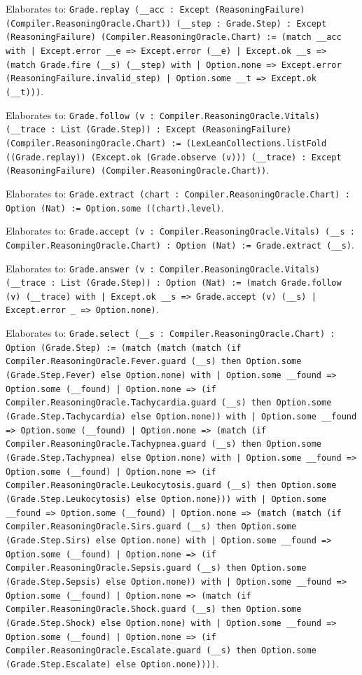 \documentclass[11pt]{article}
\begin{document}
\noindent Elaborates to: \texttt{Grade.replay (\_\_acc : Except (ReasoningFailure) (Compiler.ReasoningOracle.Chart)) (\_\_step : Grade.Step) : Except (ReasoningFailure) (Compiler.ReasoningOracle.Chart) := (match \_\_acc with | Except.error \_\_e => Except.error (\_\_e) | Except.ok \_\_s => (match Grade.fire (\_\_s) (\_\_step) with | Option.none => Except.error (ReasoningFailure.invalid\_step) | Option.some \_\_t => Except.ok (\_\_t)))}.\par
\noindent Elaborates to: \texttt{Grade.follow (v : Compiler.ReasoningOracle.Vitals) (\_\_trace : List (Grade.Step)) : Except (ReasoningFailure) (Compiler.ReasoningOracle.Chart) := (LexLeanCollections.listFold ((Grade.replay)) (Except.ok (Grade.observe (v))) (\_\_trace) : Except (ReasoningFailure) (Compiler.ReasoningOracle.Chart))}.\par
\noindent Elaborates to: \texttt{Grade.extract (chart : Compiler.ReasoningOracle.Chart) : Option (Nat) := Option.some ((chart).level)}.\par
\noindent Elaborates to: \texttt{Grade.accept (v : Compiler.ReasoningOracle.Vitals) (\_\_s : Compiler.ReasoningOracle.Chart) : Option (Nat) := Grade.extract (\_\_s)}.\par
\noindent Elaborates to: \texttt{Grade.answer (v : Compiler.ReasoningOracle.Vitals) (\_\_trace : List (Grade.Step)) : Option (Nat) := (match Grade.follow (v) (\_\_trace) with | Except.ok \_\_s => Grade.accept (v) (\_\_s) | Except.error \_ => Option.none)}.\par
\noindent Elaborates to: \texttt{Grade.select (\_\_s : Compiler.ReasoningOracle.Chart) : Option (Grade.Step) := (match (match (match (if Compiler.ReasoningOracle.Fever.guard (\_\_s) then Option.some (Grade.Step.Fever) else Option.none) with | Option.some \_\_found => Option.some (\_\_found) | Option.none => (if Compiler.ReasoningOracle.Tachycardia.guard (\_\_s) then Option.some (Grade.Step.Tachycardia) else Option.none)) with | Option.some \_\_found => Option.some (\_\_found) | Option.none => (match (if Compiler.ReasoningOracle.Tachypnea.guard (\_\_s) then Option.some (Grade.Step.Tachypnea) else Option.none) with | Option.some \_\_found => Option.some (\_\_found) | Option.none => (if Compiler.ReasoningOracle.Leukocytosis.guard (\_\_s) then Option.some (Grade.Step.Leukocytosis) else Option.none))) with | Option.some \_\_found => Option.some (\_\_found) | Option.none => (match (match (if Compiler.ReasoningOracle.Sirs.guard (\_\_s) then Option.some (Grade.Step.Sirs) else Option.none) with | Option.some \_\_found => Option.some (\_\_found) | Option.none => (if Compiler.ReasoningOracle.Sepsis.guard (\_\_s) then Option.some (Grade.Step.Sepsis) else Option.none)) with | Option.some \_\_found => Option.some (\_\_found) | Option.none => (match (if Compiler.ReasoningOracle.Shock.guard (\_\_s) then Option.some (Grade.Step.Shock) else Option.none) with | Option.some \_\_found => Option.some (\_\_found) | Option.none => (if Compiler.ReasoningOracle.Escalate.guard (\_\_s) then Option.some (Grade.Step.Escalate) else Option.none))))}.\par
\end{document}
